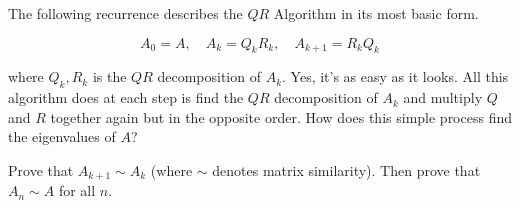 %
%
%
%
%
%

The following recurrence describes the $QR$ Algorithm in its most basic form. 

\begin{equation*}
A_0 = A, \quad A_k = Q_k R_k, \quad A_{k+1} = R_k Q_k
\end{equation*}

where $Q_k, R_k$ is the $QR$ decomposition of $A_k$. Yes, it's as easy as it looks. All this algorithm does at each step is find the $QR$ decomposition of $A_k$ and multiply $Q$ and $R$ together again but in the opposite order. How does this simple process find the eigenvalues of $A$? 

\begin{problem}
\label{problem:similarity proof}
Prove that $A_{k+1} \sim A_k$ (where $\sim$ denotes matrix similarity). Then prove that $A_n \sim A$ for all $n$.  
\end{problem}

